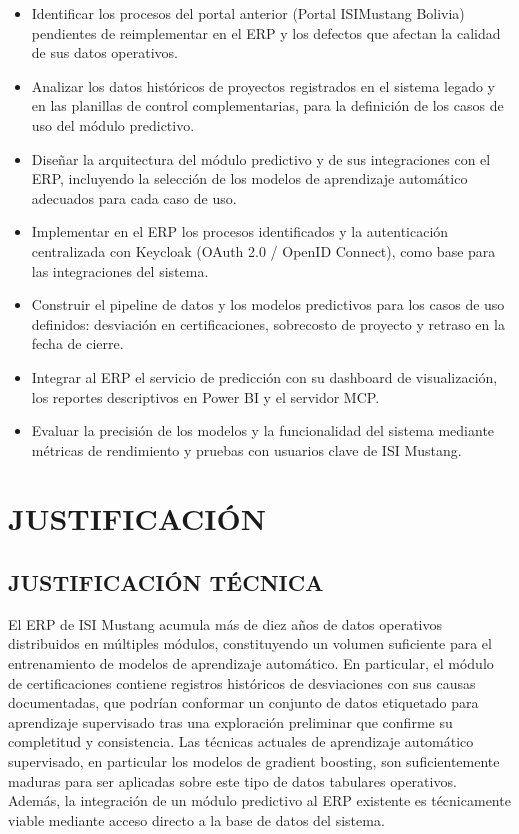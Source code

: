 \documentclass{univalle-perfil}
\begin{document}
\begin{itemize}
    \item Identificar los procesos del portal anterior (Portal ISIMustang Bolivia) pendientes de reimplementar en el ERP y los defectos que afectan la calidad de sus datos operativos.
    \item Analizar los datos históricos de proyectos registrados en el sistema legado y en las planillas de control complementarias, para la definición de los casos de uso del módulo predictivo.
    \item Diseñar la arquitectura del módulo predictivo y de sus integraciones con el ERP, incluyendo la selección de los modelos de aprendizaje automático adecuados para cada caso de uso.
    \item Implementar en el ERP los procesos identificados y la autenticación centralizada con Keycloak (OAuth 2.0 / OpenID Connect), como base para las integraciones del sistema.
    \item Construir el pipeline de datos y los modelos predictivos para los casos de uso definidos: desviación en certificaciones, sobrecosto de proyecto y retraso en la fecha de cierre.
    \item Integrar al ERP el servicio de predicción con su dashboard de visualización, los reportes descriptivos en Power BI y el servidor MCP.
    \item Evaluar la precisión de los modelos y la funcionalidad del sistema mediante métricas de rendimiento y pruebas con usuarios clave de ISI Mustang.
\end{itemize}

\section{JUSTIFICACIÓN}

\subsection{JUSTIFICACIÓN TÉCNICA}

El ERP de ISI Mustang acumula más de diez años de datos operativos distribuidos en múltiples módulos, constituyendo un volumen suficiente para el entrenamiento de modelos de aprendizaje automático. En particular, el módulo de certificaciones contiene registros históricos de desviaciones con sus causas documentadas, que podrían conformar un conjunto de datos etiquetado para aprendizaje supervisado tras una exploración preliminar que confirme su completitud y consistencia. Las técnicas actuales de aprendizaje automático supervisado, en particular los modelos de gradient boosting, son suficientemente maduras para ser aplicadas sobre este tipo de datos tabulares operativos. Además, la integración de un módulo predictivo al ERP existente es técnicamente viable mediante acceso directo a la base de datos del sistema.
\end{document}
